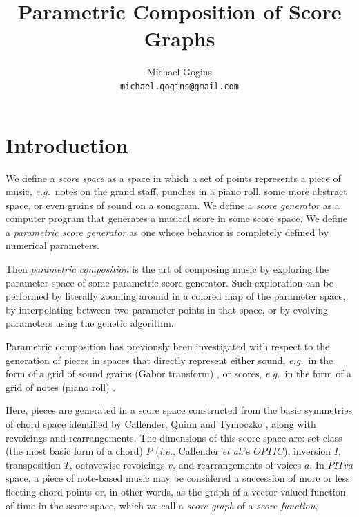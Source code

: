 \documentclass[english,11pt,letterpaper,onecolumn]{scrartcl}
\numberwithin{equation}{section}
\begin{document}
\title{Parametric Composition of Score Graphs}
\author{Michael Gogins \\ \texttt{michael.gogins@gmail.com}}
\maketitle


\section{Introduction}

We define a \textit{score space} as a space in which a set of points represents
a piece of music, \textit{e.g.}\ notes on the grand staff, punches in a piano
roll, some more abstract space, or even grains of sound on a sonogram. We
define a \textit{score generator} as a computer program that generates a
musical score in some score space. We define a \textit{parametric score
generator} as one whose behavior is completely defined by numerical parameters.

Then \textit{parametric composition} is the art of composing music by exploring
the parameter space of some parametric score generator. Such exploration can be
performed by literally zooming around in a colored map of the parameter space,
by interpolating between two parameter points in that space, or by evolving
parameters using the genetic algorithm.

Parametric composition has previously been investigated with respect to the
generation of pieces in spaces that directly represent either sound,
\textit{e.g.}\ in the form of a grid of sound grains (Gabor transform)
\cite{obsessed}, or scores, \textit{e.g.}\ in the form of a grid of notes
(piano  roll) \cite{ifsmusic}.

Here, pieces are generated in a score space constructed from the basic
symmetries of chord space identified by Callender, Quinn  and  Tymoczko
\cite{callender:346}, along with revoicings and rearrangements. The dimensions
of this score space are: set class (the most basic form of a  chord) $P$
(\textit{i.e.}, Callender \textit{et al.}'s $OPTIC$), inversion $I$,
transposition $T$, octavewise revoicings $v$, and rearrangements of voices $a$.
In $PITva$ space, a piece of note-based music may be considered a succession of
more or less fleeting chord points or, in other words, as the graph of a
vector-valued function of time in the score space, which we call a
\textit{score graph} of a \textit{score function},
\end{document}
